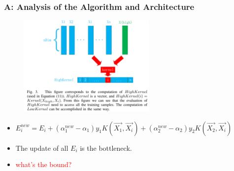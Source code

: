 \documentclass{beamer}
\begin{document}
\begin{frame}
	\frametitle{A: Analysis of the Algorithm and Architecture}

	\begin{figure}
		\includegraphics[width=0.6\textwidth]{figs/Fig3_CalcF.png}
	\end{figure} 
	\begin{itemize}
		\item $E_{i}^{new} = E_i + (\alpha_{1}^{new}-\alpha_1)y_1K(\vec{X_1},\vec{X_i}) + (\alpha_{2}^{new}-\alpha_2)y_2K(\vec{X_2},\vec{X_i})$
		\item The update of all $E_i$ is the bottleneck. 
		\item \textcolor{red}{what's the bound?}
	\end{itemize}	
\end{frame}
\end{document}
